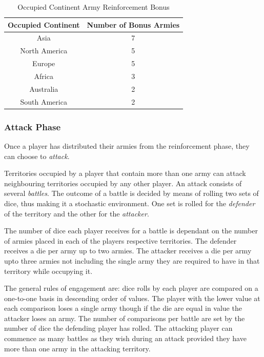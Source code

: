 \documentclass[parskip]{cs4rep}
\begin{document}
\begin{table}[ht]
\centering
\begin{tabular}{|c|c|}
\hline 
\textbf{Occupied Continent} & \textbf{Number of Bonus Armies} \\ 
\hline 
Asia & 7 \\ 
\hline 
North America & 5 \\ 
\hline 
Europe & 5 \\ 
\hline 
Africa & 3 \\
\hline
Australia & 2 \\
\hline  
South America & 2 \\
\hline 
\end{tabular}
\caption{Occupied Continent Army Reinforcement Bonus}
\label{table:continent-bonus}
\end{table}

\subsubsection{Attack Phase}

Once a player has distributed their armies from the reinforcement phase, they can choose to \textit{attack}. 

Territories occupied by a player that contain more than one army can attack neighbouring territories occupied by any other player. An attack consists of several \textit{battles}. The outcome of a battle is decided by means of rolling two sets of dice, thus making it a stochastic environment. One set is rolled for the \textit{defender} of the territory and the other for the \textit{attacker}. 

The number of dice each player receives for a battle is dependant on the number of armies placed in each of the players respective territories. The defender receives a die per army up to two armies. The attacker receives a die per army upto three armies not including the single army they are required to have in that territory while occupying it. 

The general rules of engagement are: dice rolls by each player are compared on a one-to-one basis in descending order of values. The player with the lower value at each comparison loses a single army though if the die are equal in value the attacker loses an army. The number of comparisons per battle are set by the number of dice the defending player has rolled. The attacking player can commence as many battles as they wish during an attack provided they have more than one army in the attacking territory.
\end{document}
